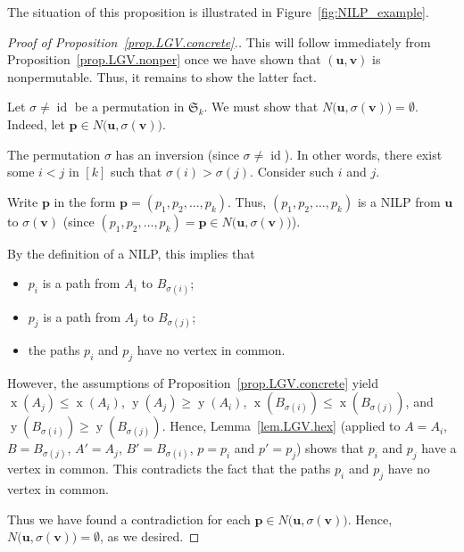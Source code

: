 \documentclass[reqno]{amsart}
\newcommand{\0}{\phantom{c}}
\newcommand{\SymGp}[1]{\mathfrak{S}_{#1}} %
\DeclareMathOperator{\xcoord}{x} %
\DeclareMathOperator{\ycoord}{y} %
\DeclareMathOperator{\id}{id} %
\newcommand{\pp}{\mathbf{p}}
\newcommand{\uu}{\mathbf{u}}
\newcommand{\vv}{\mathbf{v}}
\newenvironment{verlong}{}{}
\newcommand{\tup}[1]{\left( #1 \right)}
\newcommand{\ive}[1]{\left[ #1 \right]}
\theoremstyle{plain}
\theoremstyle{definition}
\numberwithin{equation}{section}
\begin{document}
The situation of this proposition is illustrated in Figure~\ref{fig:NILP_example}.

\begin{verlong}
\begin{proof}[Proof of Proposition~\ref{prop.LGV.concrete}.]
This will follow immediately from Proposition~\ref{prop.LGV.nonper}
once we have shown that $\left( \uu,\vv\right)  $ is nonpermutable.
Thus, it remains to show the latter fact.

Let $\sigma\neq\id$ be a permutation in $\SymGp{k}$.
We must show that $N\bigl(\uu, \sigma(\vv) \bigr) = \emptyset$.
Indeed, let $\pp\in N\bigl( \uu,\sigma(\vv) \bigr)$.

The permutation $\sigma$ has an inversion (since $\sigma \neq \id$).
In other words, there exist some $i<j$ in $\ive{k}$ such that $\sigma(i) > \sigma(j)$.
Consider such $i$ and $j$.

Write $\pp$ in the form $\pp = \tup{p_1, p_2, \dotsc, p_k}$.
Thus, $\tup{p_1, p_2, \dotsc, p_k}$ is a NILP from $\uu$ to $\sigma(\vv)$ (since $\tup{p_1, p_2, \dotsc, p_k} = \pp\in N\bigl( \uu, \sigma(\vv) \bigr)$).

By the definition of a NILP, this implies that
\begin{itemize}
\item $p_i$ is a path from $A_i$ to $B_{\sigma(i)}$;

\item $p_j$ is a path from $A_j$ to $B_{\sigma(j)}$;

\item the paths $p_i$ and $p_j$ have no vertex in common.
\end{itemize}

However, the assumptions of Proposition~\ref{prop.LGV.concrete} yield
$\xcoord(A_j) \leq \xcoord(A_i)$,
$\ycoord(A_j) \geq \ycoord(A_i)$,
$\xcoord(B_{\sigma(i)}) \leq \xcoord(B_{\sigma(j)})$, and
$\ycoord(B_{\sigma(i)}) \geq \ycoord(B_{\sigma(j)})$.
Hence, Lemma~\ref{lem.LGV.hex} (applied to $A = A_i$, $B = B_{\sigma(j)}$, $A' = A_j$, $B' = B_{\sigma(i)}$, $p = p_i$ and $p' = p_j$) shows that $p_i$ and $p_j$ have a vertex in common.
This contradicts the fact that the paths $p_i$ and $p_j$ have no vertex in common.

Thus we have found a contradiction for each $\pp\in N\bigl( \uu,\sigma(\vv) \bigr)$.
Hence, $N\bigl(\uu, \sigma(\vv) \bigr) = \emptyset$, as we desired.
\end{proof}
\end{verlong}
\end{document}

